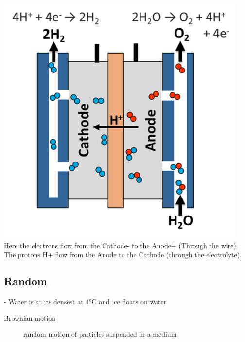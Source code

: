 \includegraphics{./includes/chemistry/imgs/electrolyzer.png}
\\
Here the electrons flow from the Cathode- to the Anode+ (Through the wire).\\
The protons H+ flow from the Anode to the Cathode (through the electrolyte).

\subsection{Random}
- Water is at its densest at 4°C and ice floats on water

\begin{description}
    \item[Brownian motion] random motion of particles suspended in a medium
\end{description}